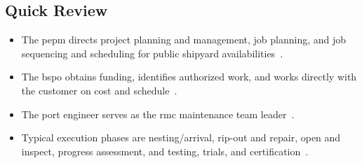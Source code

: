 \documentclass[../main.tex]{subfiles}
\begin{document}
\subsection{Quick Review}
\begin{itemize}
  \item The \ac{pepm} directs project planning and management, job planning, and job sequencing and scheduling for public shipyard availabilities~\autocite{edo-4-2-2-cno-availability-execution-2025}.
  \item The \ac{bspo} obtains funding, identifies authorized work, and works directly with the customer on cost and schedule~\autocite{edo-4-2-2-cno-availability-execution-2025}.
  \item The port engineer serves as the \ac{rmc} maintenance team leader~\autocite{edo-4-2-2-cno-availability-execution-2025}.
  \item Typical execution phases are nesting/arrival, rip-out and repair, open and inspect, progress assessment, and testing, trials, and certification~\autocite{edo-4-2-2-cno-availability-execution-2025}.
\end{itemize}

\end{document}
